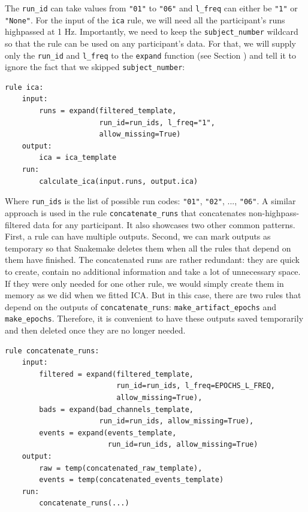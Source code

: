 \documentclass[a4paper,man,floatsintext,natbib]{apa6}
\begin{document}
The \verb|run_id| can take values from \verb|"01"| to \verb|"06"| and \verb|l_freq| can either be \verb|"1"| or \verb|"None"|. For the input of the \verb|ica| rule, we will need all the participant's runs highpassed at 1 Hz. Importantly, we need to keep the \verb|subject_number| wildcard so that the rule can be used on any participant's data. For that, we will supply only the \verb|run_id| and \verb|l_freq| to the \verb|expand| function (see Section ) and tell it to ignore the fact that we skipped \verb|subject_number|:

\begin{verbatim}
rule ica:
    input:
        runs = expand(filtered_template, 
                      run_id=run_ids, l_freq="1",
                      allow_missing=True)
    output:
        ica = ica_template
    run:
        calculate_ica(input.runs, output.ica)
\end{verbatim}

Where \verb|run_ids| is the list of possible run codes: \verb|"01"|, \verb|"02"|, ..., \verb|"06"|. A similar approach is used in the rule \verb|concatenate_runs| that concatenates non-highpass-filtered data for any participant. It also showcases two other common patterns. First, a rule can have multiple outputs. Second, we can mark outputs as temporary so that Snakemake deletes them when all the rules that depend on them have finished. The concatenated runs are rather redundant: they are quick to create, contain no additional information and take a lot of unnecessary space. If they were only needed for one other rule, we would simply create them in memory as we did when we fitted ICA. But in this case, there are two rules that depend on the outputs of \verb|concatenate_runs|: \verb|make_artifact_epochs| and \verb|make_epochs|. Therefore, it is convenient to have these outputs saved temporarily and then deleted once they are no longer needed.

\begin{verbatim}
rule concatenate_runs:
    input:
        filtered = expand(filtered_template, 
                          run_id=run_ids, l_freq=EPOCHS_L_FREQ,
                          allow_missing=True),
        bads = expand(bad_channels_template,
                      run_id=run_ids, allow_missing=True),
        events = expand(events_template,
                        run_id=run_ids, allow_missing=True)
    output:
        raw = temp(concatenated_raw_template),
        events = temp(concatenated_events_template)
    run:
        concatenate_runs(...)
\end{verbatim}
\end{document}
